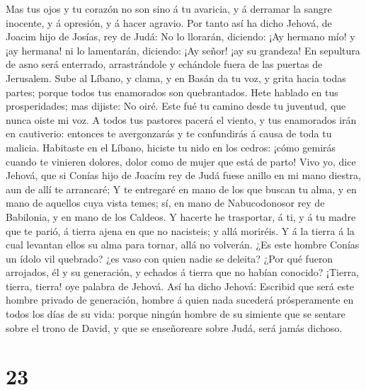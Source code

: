  Mas tus ojos y tu corazón no son sino á tu avaricia, y á
derramar la sangre inocente, y á opresión, y á hacer agravio.
 Por tanto así ha dicho Jehová, de Joacim hijo de Josías,
rey de Judá: No lo llorarán, diciendo: ¡Ay hermano mío! y ¡ay hermana!
ni lo lamentarán, diciendo: ¡Ay señor! ¡ay su grandeza! 
En sepultura de asno será enterrado, arrastrándole y echándole fuera de
las puertas de Jerusalem.  Sube al Líbano, y clama, y en
Basán da tu voz, y grita hacia todas partes; porque todos tus enamorados
son quebrantados.  Hete hablado en tus prosperidades; mas
dijiste: No oiré. Este fué tu camino desde tu juventud, que nunca oiste
mi voz.  A todos tus pastores pacerá el viento, y tus
enamorados irán en cautiverio: entonces te avergonzarás y te confundirás
á causa de toda tu malicia.  Habitaste en el Líbano,
hiciste tu nido en los cedros: ¡cómo gemirás cuando te vinieren dolores,
dolor como de mujer que está de parto!  Vivo yo, dice
Jehová, que si Conías hijo de Joacím rey de Judá fuese anillo en mi mano
diestra, aun de allí te arrancaré;  Y te entregaré en
mano de los que buscan tu alma, y en mano de aquellos cuya vista temes;
sí, en mano de Nabucodonosor rey de Babilonia, y en mano de los Caldeos.
 Y hacerte he trasportar, á ti, y á tu madre que te
parió, á tierra ajena en que no nacisteis; y allá moriréis.
 Y á la tierra á la cual levantan ellos su alma para
tornar, allá no volverán.  ¿Es este hombre Conías un
ídolo vil quebrado? ¿es vaso con quien nadie se deleita? ¿Por qué fueron
arrojados, él y su generación, y echados á tierra que no habían
conocido?  ¡Tierra, tierra, tierra! oye palabra de
Jehová.  Así ha dicho Jehová: Escribid que será este
hombre privado de generación, hombre á quien nada sucederá prósperamente
en todos los días de su vida: porque ningún hombre de su simiente que se
sentare sobre el trono de David, y que se enseñoreare sobre Judá, será
jamás dichoso.

\hypertarget{section-22}{%
\section{23}\label{section-22}}

